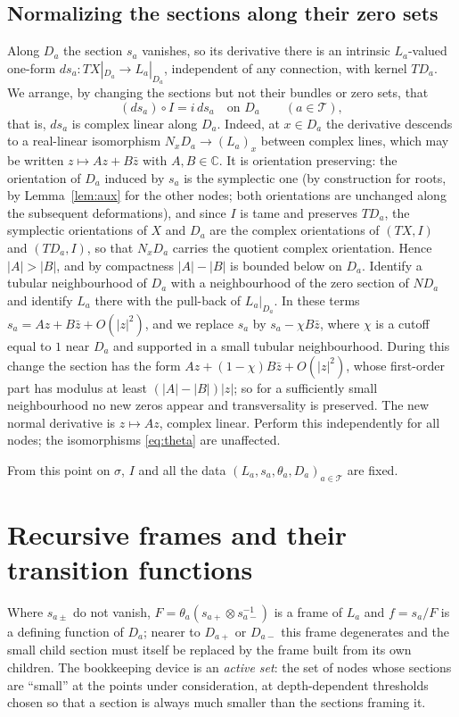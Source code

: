 \documentclass[11pt]{article}
\theoremstyle{remark}
\newcommand{\C}{\mathbb C}
\newcommand{\cT}{\mathcal T}
\begin{document}
\subsection*{Normalizing the sections along their zero sets}
Along $D_a$ the section $s_a$ vanishes, so its derivative there is an
intrinsic $L_a$-valued one-form $ds_a\colon TX|_{D_a}\to L_a|_{D_a}$,
independent of any connection, with kernel $TD_a$. We arrange, by
changing the sections but not their bundles or zero sets, that
\begin{equation}\label{eq:normal-linear}
 (ds_a)\circ I=i\,ds_a\quad\text{on }D_a\qquad(a\in\cT),
\end{equation}
that is, $ds_a$ is complex linear along $D_a$. Indeed, at $x\in D_a$
the derivative descends to a real-linear isomorphism
$N_xD_a\to(L_a)_x$ between complex lines, which may be written
$z\mapsto Az+B\bar z$ with $A,B\in\C$. It is orientation preserving:
the orientation of $D_a$ induced by $s_a$ is the symplectic one (by
construction for roots, by Lemma~\ref{lem:aux} for the other nodes;
both orientations are unchanged along the subsequent deformations),
and since $I$ is tame and preserves $TD_a$, the symplectic orientations
of $X$ and $D_a$ are the complex orientations of $(TX,I)$ and
$(TD_a,I)$, so that $N_xD_a$ carries the quotient complex orientation.
Hence $|A|>|B|$, and by compactness $|A|-|B|$ is bounded below on $D_a$. Identify a tubular neighbourhood of $D_a$ with a
neighbourhood of the zero section of $ND_a$ and identify $L_a$ there
with the pull-back of $L_a|_{D_a}$. In these terms $s_a=Az+B\bar z+O(|z|^2)$,
and we replace $s_a$ by $s_a-\chi B\bar z$, where $\chi$ is a cutoff
equal to $1$ near $D_a$ and supported in a small tubular neighbourhood.
During this change the section has the form
$Az+(1-\chi)B\bar z+O(|z|^2)$, whose first-order part has modulus at
least $(|A|-|B|)|z|$; so for a sufficiently small neighbourhood no new
zeros appear and transversality is preserved. The new normal derivative is $z\mapsto Az$, complex
linear. Perform this independently for all nodes; the isomorphisms
\eqref{eq:theta} are unaffected.

From this point on $\sigma$, $I$ and all the data
$(L_a,s_a,\theta_a,D_a)_{a\in\cT}$ are fixed.

\section{Recursive frames and their transition functions}\label{sec:frames}

Where $s_{a\pm}$ do not vanish, $F=\theta_a(s_{a+}\otimes s_{a-}^{-1})$
is a frame of $L_a$ and $f=s_a/F$ is a defining function of $D_a$;
nearer to $D_{a+}$ or $D_{a-}$ this frame degenerates and the small
child section must itself be replaced by the frame built from its own
children. The bookkeeping device is an \emph{active set}: the set of nodes
whose sections are ``small'' at the points under consideration, at
depth-dependent thresholds chosen so that a section is always much
smaller than the sections framing it.
\end{document}
